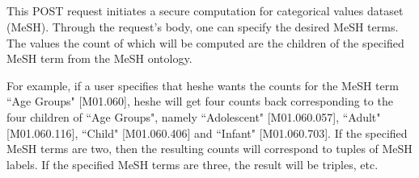 \subsection[/smpc/histogram/categorical POST request]{\protect{}}\label{s:post2}
This POST request initiates a secure computation for categorical values dataset (MeSH).
Through the request's body, one can specify the desired MeSH terms.
The values the count of which will be computed are the children of the specified MeSH term from the MeSH ontology.

For example, if a user specifies that he\myslash she wants the counts for the MeSH term ``Age Groups" [M01.060], he\myslash she will get four counts back corresponding to the four children of ``Age Groups", namely ``Adolescent" [M01.060.057], ``Adult" [M01.060.116], ``Child" [M01.060.406] and ``Infant" [M01.060.703].
If the specified MeSH terms are two, then the resulting counts will correspond to tuples of MeSH labels.
If the specified MeSH terms are three, the result will be triples, etc.

